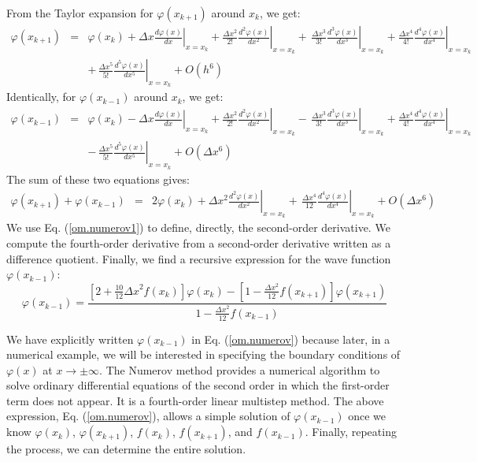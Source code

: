 \documentclass[onecolumn,nofootinbib, secnumarabic, amsmath, nobibnotes,12pt,aps,pra]{revtex4-1}
\newcommand{\eref}[1]{Eq. (\ref{#1})}
\begin{document}
From the Taylor expansion for $\varphi(x_{k + 1})$ around $x_k$, we get:
\begin{eqnarray}
\varphi(x_{k + 1}) &=& \varphi(x_{k}) + \Delta x \left.\frac {d\varphi(x)}{dx}\right|_{x = x_k} + \frac{\Delta x^2}{2!} \left.\frac {d^2\varphi(x)}{dx^2}\right|_{x = x_k} +\, \left.\frac{\Delta x^3}{3!} \frac{d^3\varphi(x)}{dx^3}\right|_{x = x_k} + \frac{\Delta x^4}{4!} \left.\frac{d^4\varphi(x)}{dx^4}\right|_{x = x_k}\nonumber\\
&&+\, \frac{\Delta x^5}{5!} \left.\frac{d^5\varphi(x)}{dx^5}\right|_{x = x_k} + {O} (h^6)
\end{eqnarray}
Identically, for $\varphi(x_{k-1})$ around $x_k$, we get:
\begin{eqnarray}
\varphi(x_{k - 1}) &=& \varphi(x_{k}) - \Delta x \left.\frac {d\varphi(x)}{dx}\right|_{x = x_k} + \frac{\Delta x^2}{2!} \left. \frac {d^2\varphi(x)}{dx^2}\right|_{x = x_k}-\, \frac{\Delta x^3}{3!} \left.\frac{d^3\varphi(x)}{dx^3}\right|_{x = x_k}
 + \frac{\Delta x^4}{4!} \left.\frac{d^4\varphi(x)}{dx^4}\right|_{x = x_k}\nonumber\\ &&-\, \frac{\Delta x^5}{5!} \left.\frac{d^5\varphi(x)}{dx^5}\right|_{x = x_k} + {O} (\Delta x^6)
\end{eqnarray}
The sum of these two equations gives:
\begin{eqnarray}
\varphi(x_{k + 1}) + \varphi(x_{k-1}) &=& 2\varphi(x_{k}) + {\Delta x^2} \left.\frac {d^2\varphi(x)}{dx^2}\right|_{x = x_k}+\, \frac{\Delta x^4}{12} \left.\frac {d^4\varphi(x)}{dx^4}\right|_{x = x_k} + {O} (\Delta x^6)
\end{eqnarray}
We use \eref{om.numerov1} to define, directly, the second-order derivative. We compute the fourth-order derivative from a second-order derivative written as a difference  quotient. Finally, we find a recursive expression for the wave function $\varphi(x_{k-1})$:
\begin{equation}
\varphi(x_{k - 1}) = \frac{\left[2 + \frac{10}{12}{\Delta x}^{2}f(x_k) \right]\varphi(x_{k}) - \left[1 - \frac{{\Delta x}^{2}}{12}f(x_{k + 1}) \right]\varphi(x_{k + 1})}{1 - \frac{{\Delta x}^{2}}{12}f(x_{k - 1})}
\label{om.numerov}
\end{equation}

We have explicitly written $\varphi(x_{k - 1})$ in \eref{om.numerov}
because later, in a numerical example, we will be interested in
specifying the boundary conditions of $\varphi(x)$ at $x\rightarrow
\pm \infty$. The Numerov method \cite{om.numrov1,om.numrov2}
provides a numerical algorithm to solve ordinary differential
equations of the second order in which the first-order term does not
appear. It is a fourth-order linear multistep method. The above
expression, \eref{om.numerov}, allows a simple solution of
$\varphi(x_{k-1})$ once we know $\varphi(x_{k})$, $\varphi(x_{k +
1})$, $f(x_k)$, $f(x_{k + 1})$, and $f(x_{k-1})$. Finally, repeating
the process, we can determine the entire solution.
\end{document}
